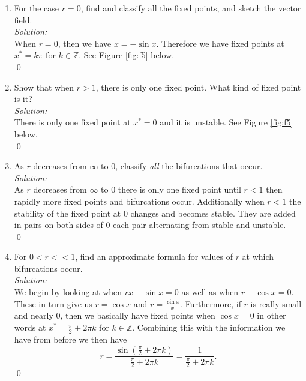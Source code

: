 \documentclass[10pt]{amsart}
\theoremstyle{nonumberplain}
\begin{document}
\begin{enumerate}[label={\bf {\arabic*}:}]
\begin{enumerate}
\item For the case $r = 0$, find and classify all the fixed points, and sketch the vector field. \\

\noindent
\textit{Solution:} \\
When $r = 0$, then we have $\dot x = - \sin x$.
Therefore we have fixed points at $x^* = k\pi$ for $k \in \mathbb Z$.
See Figure \ref{fig:f5} below. \\
\qed \\

\item Show that when $r > 1$, there is only one fixed point.
What kind of fixed point is it? \\

\noindent
\textit{Solution:} \\
There is only one fixed point at $x^* = 0$ and it is unstable.
See Figure \ref{fig:f5} below. \\
\qed \\

\item As $r$ decreases from $\infty$ to $0$, classify \textit{all} the bifurcations that occur. \\

\noindent
\textit{Solution:} \\
As $r$ decreases from $\infty$ to $0$ there is only one fixed point until $r < 1$ then rapidly more fixed points and bifurcations occur.
Additionally when $r < 1$ the stability of the fixed point at 0 changes and becomes stable.
They are added in pairs on both sides of 0 each pair alternating from stable and unstable. \\
\qed \\

\item For $0 < r << 1$, find an approximate formula for values of $r$ at which bifurcations occur. \\

\noindent
\textit{Solution:} \\
We begin by looking at when $rx - \sin x = 0$ as well as when $r - \cos x = 0$.
These in turn give us $r = \cos x$ and $r = \frac {\sin x}{x}$.
Furthermore, if $r$ is really small and nearly 0, then we basically have fixed points when $\cos x = 0$ in other words at $x^* = \frac {\pi}{2} + 2 \pi k$ for $k \in \mathbb Z$.
Combining this with the information we have from before we then have
$$
r = \frac {\sin \left( \frac {\pi}{2} + 2 \pi k\right)}{\frac {\pi}{2} + 2 \pi k}
= \frac{1}{\frac {\pi}{2} + 2 \pi k}.
$$
\qed \\


\end{enumerate}
\end{enumerate}
\end{document}

